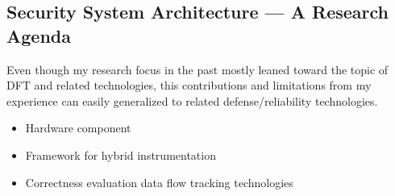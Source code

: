 \documentclass[letterpaper, 10pt]{article}
\begin{document}
\begin{small}
\subsubsection*{}


\subsection*{Security System Architecture ---  A Research Agenda}
Even though my research focus in the past mostly leaned toward the topic of DFT
and related technologies, this contributions and limitations from my experience
can easily generalized to related defense/reliability technologies.

\begin{itemize}
  \item Hardware component
  \item Framework for hybrid instrumentation
  \item Correctness evaluation data flow tracking technologies
\end{itemize}


\end{small}
\end{document}
